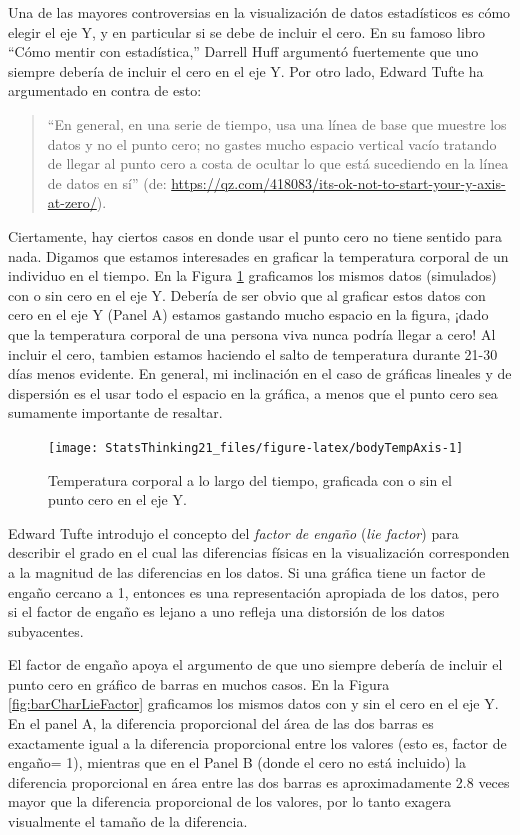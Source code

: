 \documentclass[
  12pt,
]{book}
\begin{document}
Una de las mayores controversias en la visualización de datos estadísticos es cómo elegir el eje Y, y en particular si se debe de incluir el cero. En su famoso libro ``Cómo mentir con estadística,'' Darrell Huff argumentó fuertemente que uno siempre debería de incluir el cero en el eje Y. Por otro lado, Edward Tufte ha argumentado en contra de esto:

\begin{quote}
``En general, en una serie de tiempo, usa una línea de base que muestre los datos y no el punto cero; no gastes mucho espacio vertical vacío tratando de llegar al punto cero a costa de ocultar lo que está sucediendo en la línea de datos en sí'' (de: \url{https://qz.com/418083/its-ok-not-to-start-your-y-axis-at-zero/}).
\end{quote}

Ciertamente, hay ciertos casos en donde usar el punto cero no tiene sentido para nada. Digamos que estamos interesades en graficar la temperatura corporal de un individuo en el tiempo. En la Figura \ref{fig:bodyTempAxis} graficamos los mismos datos (simulados) con o sin cero en el eje Y. Debería de ser obvio que al graficar estos datos con cero en el eje Y (Panel A) estamos gastando mucho espacio en la figura, ¡dado que la temperatura corporal de una persona viva nunca podría llegar a cero! Al incluir el cero, tambien estamos haciendo el salto de temperatura durante 21-30 días menos evidente. En general, mi inclinación en el caso de gráficas lineales y de dispersión es el usar todo el espacio en la gráfica, a menos que el punto cero sea sumamente importante de resaltar.

\begin{figure}
\texttt{[image: StatsThinking21\_files/figure-latex/bodyTempAxis-1]} \caption{Temperatura corporal a lo largo del tiempo, graficada con o sin el punto cero en el eje Y.}\label{fig:bodyTempAxis}
\end{figure}

Edward Tufte introdujo el concepto del \emph{factor de engaño} (\emph{lie factor}) para describir el grado en el cual las diferencias físicas en la visualización corresponden a la magnitud de las diferencias en los datos. Si una gráfica tiene un factor de engaño cercano a 1, entonces es una representación apropiada de los datos, pero si el factor de engaño es lejano a uno refleja una distorsión de los datos subyacentes.

El factor de engaño apoya el argumento de que uno siempre debería de incluir el punto cero en gráfico de barras en muchos casos. En la Figura \ref{fig:barCharLieFactor} graficamos los mismos datos con y sin el cero en el eje Y. En el panel A, la diferencia proporcional del área de las dos barras es exactamente igual a la diferencia proporcional entre los valores (esto es, factor de engaño= 1), mientras que en el Panel B (donde el cero no está incluido) la diferencia proporcional en área entre las dos barras es aproximadamente 2.8 veces mayor que la diferencia proporcional de los valores, por lo tanto exagera visualmente el tamaño de la diferencia.
\end{document}
